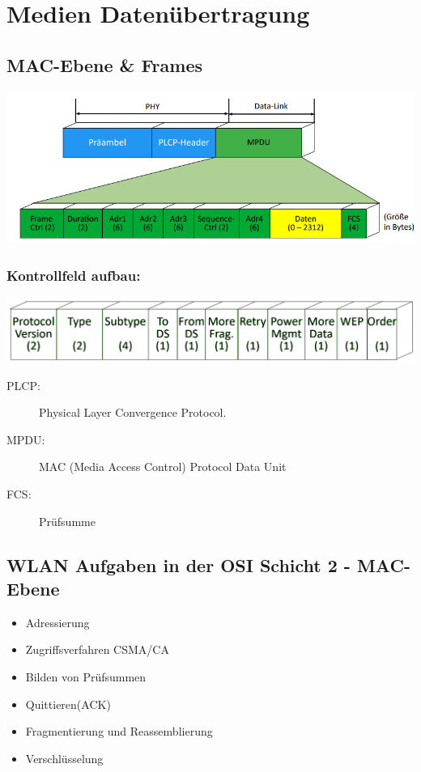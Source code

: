 \documentclass[12pt,a4paper]{article}
\begin{document}
\section{Medien Datenübertragung}
	\subsection{MAC-Ebene \& Frames}
		\includegraphics[scale=0.7]{Bilder/MAC Ebenene.png}\\
		\subsubsection{Kontrollfeld aufbau:}
		\includegraphics[scale=0.4]{Bilder/Control field structure-removedBg.png}
		\begin{description}
			\item[PLCP:] Physical Layer Convergence Protocol. 
			\item[MPDU:] MAC (Media Access Control) Protocol Data Unit 
			\item[FCS:] Prüfsumme
		\end{description}

	\subsection{WLAN Aufgaben in der OSI Schicht 2 - MAC-Ebene}
		\begin{itemize}
			\item Adressierung
			\item Zugriffsverfahren CSMA/CA
			\item Bilden von Prüfsummen
			\item Quittieren(ACK)
			\item Fragmentierung und Reassemblierung
			\item Verschlüsselung
		\end{itemize}
\end{document}
